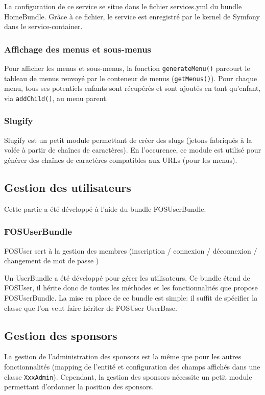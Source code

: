 \documentclass[a4paper,12pt, notitlepage]{report}
\begin{document}
La configuration de ce service se situe dans le fichier services.yml du bundle HomeBundle. Grâce à ce fichier, le \gls{service} est enregistré par le kernel de Symfony dans le \gls{service-container}.



\subsubsection{Affichage des menus et sous-menus}

Pour afficher les menus et sous-menus, la fonction \verb?generateMenu()? parcourt le tableau de menus renvoyé par le conteneur de menus (\verb?getMenus()?).
Pour chaque menu, tous ses potentiels enfants sont récupérés et sont ajoutés en tant qu'enfant, via \verb?addChild()?, au menu parent.

\subsubsection{Slugify}
Slugify est un petit module permettant de créer des slugs (jetons fabriqués à la volée à partir de chaînes de caractères). En l'occurence, ce module est utilisé pour générer des chaînes de caractères compatibles aux URLs (pour les menus).

\subsection{Gestion des utilisateurs}
Cette partie a été développé à l'aide du bundle FOSUserBundle.
\subsubsection{FOSUserBundle}
FOSUser sert à la gestion des membres (inscription / connexion / déconnexion / changement de mot de passe )

Un UserBundle a été développé pour gérer les utilisateurs. Ce \gls{bundle} étend de FOSUser, il hérite donc de toutes les méthodes et les fonctionnalités que propose FOSUserBundle. La mise en place de ce \gls{bundle} est simple: il suffit de spécifier la classe que l'on veut faire hériter de FOSUser UserBase.  
\subsection{Gestion des sponsors}
La gestion de l'administration des sponsors est la même que pour les autres fonctionnalités (mapping de l'entité et configuration des champs affichés dans une classe \verb?XxxAdmin?). Cependant, la gestion des sponsors nécessite un petit module permettant d'ordonner la position des sponsors.
\end{document}
